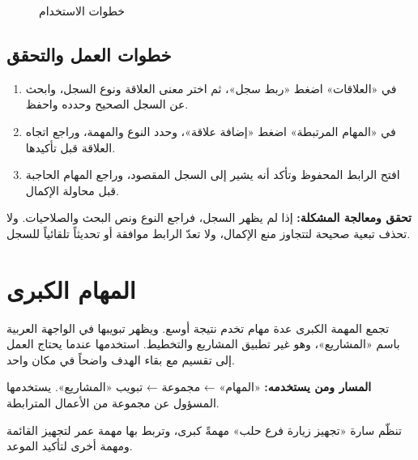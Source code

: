 \begin{figure}[H]
\centering
{}
\rclegend
\caption{خطوات الاستخدام}
\label{fig:tasks-relationships-flow}
\end{figure}

\subsection{خطوات العمل والتحقق}
\begin{enumerate}
\item في «العلاقات» اضغط «ربط سجل»، ثم اختر معنى العلاقة ونوع السجل، وابحث عن السجل الصحيح وحدده واحفظ.
\item في «المهام المرتبطة» اضغط «إضافة علاقة»، وحدد النوع والمهمة، وراجع اتجاه العلاقة قبل تأكيدها.
\item افتح الرابط المحفوظ وتأكد أنه يشير إلى السجل المقصود، وراجع المهام الحاجبة قبل محاولة الإكمال.
\end{enumerate}

\textbf{تحقق ومعالجة المشكلة:} إذا لم يظهر السجل، فراجع النوع ونص البحث والصلاحيات. ولا تحذف تبعية صحيحة لتتجاوز منع الإكمال، ولا تعدّ الرابط موافقة أو تحديثاً تلقائياً للسجل.

\clearpage
\section{المهام الكبرى}
\label{sec:tasks-feature-epics}

تجمع المهمة الكبرى عدة مهام تخدم نتيجة أوسع. ويظهر تبويبها في الواجهة العربية باسم «المشاريع»، وهو غير تطبيق المشاريع والتخطيط. استخدمها عندما يحتاج العمل إلى تقسيم مع بقاء الهدف واضحاً في مكان واحد.

\textbf{المسار ومن يستخدمه:} «المهام» ← مجموعة ← تبويب «المشاريع». يستخدمها المسؤول عن مجموعة من الأعمال المترابطة.

\begin{rcnote}
تنظّم سارة «تجهيز زيارة فرع حلب» مهمةً كبرى، وتربط بها مهمة عمر لتجهيز القائمة ومهمة أخرى لتأكيد الموعد.
\end{rcnote}

